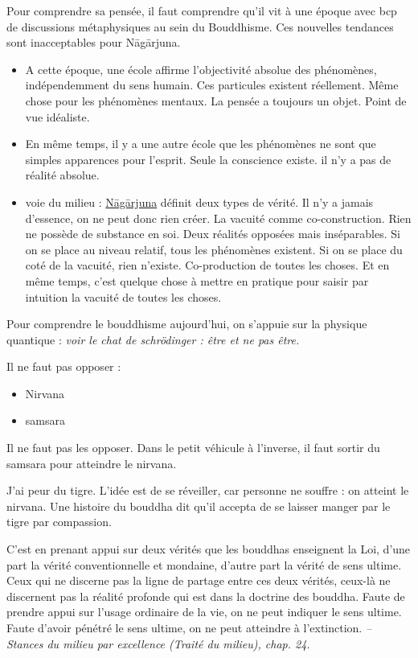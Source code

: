 Pour comprendre sa pensée, il faut comprendre qu'il vit à une époque avec bcp de discussions métaphysiques au sein du Bouddhisme. Ces nouvelles tendances sont inacceptables pour Nāgārjuna.

\begin{itemize}
    \item A cette époque, une école affirme l'objectivité absolue des phénomènes, indépendemment du sens humain. Ces particules existent réellement. Même chose pour les phénomènes mentaux. 
La pensée a toujours un objet. Point de vue idéaliste.

    \item En même temps, il y a une autre école que les phénomènes ne sont que simples apparences pour l'esprit. Seule la conscience existe. il n'y a pas de réalité absolue.
        \item voie du milieu : \href{https://fr.wikipedia.org/wiki/Madhyamaka}{Nāgārjuna} définit deux types de vérité.  Il n'y a jamais d'essence, on ne peut donc rien créer. La vacuité comme co-construction. Rien ne possède de substance en soi. Deux réalités opposées mais inséparables. Si on se place au niveau relatif, tous les phénomènes existent. Si on se place du coté de la vacuité, rien n'existe. Co-production de toutes les choses. Et en même temps, c'est quelque chose à mettre en pratique pour saisir par intuition la vacuité de toutes les choses. 
\end{itemize}
Pour comprendre le bouddhisme aujourd'hui, on s'appuie sur la physique quantique : \textit{voir le chat de schrödinger : être et ne pas être.}

Il ne faut pas opposer : 
\begin{itemize}
    \item Nirvana
    \item samsara
\end{itemize}
Il ne faut pas les opposer. Dans le petit véhicule à l'inverse, il faut sortir du samsara pour atteindre le nirvana. 

\begin{Ex}[le tigre]
    J'ai peur du tigre. L'idée est de se réveiller, car personne ne souffre : on atteint le nirvana. Une histoire du bouddha dit qu'il accepta de se laisser manger par le tigre par compassion. 
\end{Ex}

\begin{singlequote}
    C’est en prenant appui sur deux vérités que les bouddhas enseignent la Loi, d’une part la vérité conventionnelle et mondaine, d’autre part la vérité de sens ultime.
    Ceux qui ne discerne pas la ligne de partage entre ces deux vérités, ceux-là ne discernent pas la réalité profonde qui est dans la doctrine des bouddha.
    Faute de prendre appui sur l’usage ordinaire de la vie, on ne peut indiquer le sens ultime. Faute d’avoir pénétré le sens ultime, on ne peut atteindre à l’extinction.
\textit{-- Stances du milieu par excellence (Traité du milieu), chap. 24.}

\end{singlequote}

